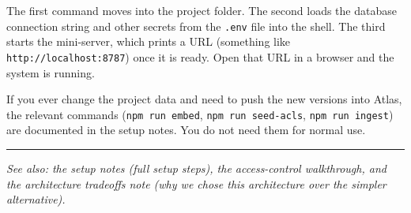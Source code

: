 \documentclass[11pt,a4paper]{article}
\begin{document}
The first command moves into the project folder. The second loads the database connection string and other secrets from the \texttt{.env} file into the shell. The third starts the mini-server, which prints a URL (something like \texttt{http://localhost:8787}) once it is ready. Open that URL in a browser and the system is running.

If you ever change the project data and need to push the new versions into Atlas, the relevant commands (\texttt{npm run embed}, \texttt{npm run seed-acls}, \texttt{npm run ingest}) are documented in the setup notes. You do not need them for normal use.

\bigskip

\noindent\textcolor{usydred}{\rule{\textwidth}{1pt}}

\noindent\textit{\small See also: the setup notes (full setup steps), the access-control walkthrough, and the architecture tradeoffs note (why we chose this architecture over the simpler alternative).}
\end{document}
